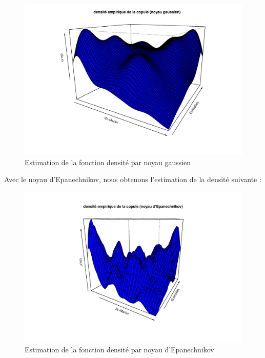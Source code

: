 \noindent%
\begin{figure}[H]
    \begin{center}
      \includegraphics[width=16 cm, angle=0]{./pictures/densite_empir_gaussien.png}
      \centering\caption{Estimation de la fonction densité par noyau gaussien}
    \end{center}
\end{figure}

Avec le noyau d’Epanechnikov, nous obtenons l'estimation de la densité suivante :

\noindent%
\begin{figure}[H]
    \begin{center}
      \includegraphics[width=16 cm, angle=0]{./pictures/densite_empir_Epanechnikov.png}
      \centering\caption{Estimation de la fonction densité par noyau d'Epanechnikov}
    \end{center}
\end{figure}

